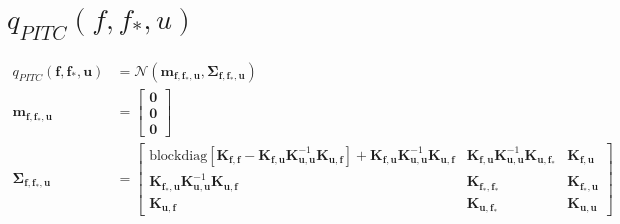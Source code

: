 \documentclass[12pt, landscape]{article}
\begin{document}
\section{$q_{PITC}(f,f_{*},u)$}
\begingroup\makeatletter{}\check@mathfonts
\def\maketag@@@#1{\hbox{\m@th\large\normalfont#1}}
\begin{align*}
q_{PITC}\left(\mathbf{f},\mathbf{f_{*}},\mathbf{u}\right)&= \mathcal{N}\left(\mathbf{m}_{\mathbf{f},\mathbf{f_{*}},\mathbf{u}},\mathbf{\Sigma}_{\mathbf{f},\mathbf{f_{*}},\mathbf{u}}\right)\\
\mathbf{m}_{\mathbf{f},\mathbf{f_{*}},\mathbf{u}} &= \left[\begin{smallmatrix}\mathbf{0}\\\mathbf{0}\\\mathbf{0}\end{smallmatrix}\right]\\
\mathbf{\Sigma}_{\mathbf{f},\mathbf{f_{*}},\mathbf{u}} &= \left[\begin{smallmatrix}\text{blockdiag}[\mathbf{K}_{\mathbf{f},\mathbf{f}} - \mathbf{K}_{\mathbf{f},\mathbf{u}} \mathbf{K}_{\mathbf{u},\mathbf{u}}^{-1} \mathbf{K}_{\mathbf{u},\mathbf{f}}] + \mathbf{K}_{\mathbf{f},\mathbf{u}} \mathbf{K}_{\mathbf{u},\mathbf{u}}^{-1} \mathbf{K}_{\mathbf{u},\mathbf{f}}&\mathbf{K}_{\mathbf{f},\mathbf{u}} \mathbf{K}_{\mathbf{u},\mathbf{u}}^{-1} \mathbf{K}_{\mathbf{u},\mathbf{f_{*}}}&\mathbf{K}_{\mathbf{f},\mathbf{u}}\\\mathbf{K}_{\mathbf{f_{*}},\mathbf{u}} \mathbf{K}_{\mathbf{u},\mathbf{u}}^{-1} \mathbf{K}_{\mathbf{u},\mathbf{f}}&\mathbf{K}_{\mathbf{f_{*}},\mathbf{f_{*}}}&\mathbf{K}_{\mathbf{f_{*}},\mathbf{u}}\\\mathbf{K}_{\mathbf{u},\mathbf{f}}&\mathbf{K}_{\mathbf{u},\mathbf{f_{*}}}&\mathbf{K}_{\mathbf{u},\mathbf{u}}\end{smallmatrix}\right]\\
\end{align*}\endgroup
\end{document}
